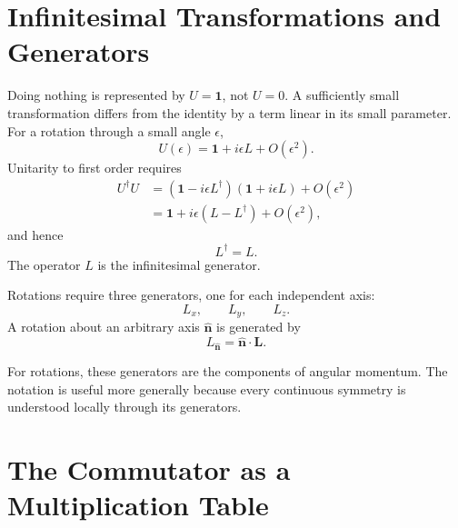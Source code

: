 \section{Infinitesimal Transformations and Generators}

Doing nothing is represented by \(U=\mathbf 1\), not \(U=0\). A sufficiently small transformation differs from the identity by a term linear in its small parameter. For a rotation through a small angle \(\epsilon\),
\begin{equation}
U(\epsilon)=\mathbf 1+i\epsilon L+O(\epsilon^2).
\end{equation}
Unitarity to first order requires
\begin{align}
U^\dagger U
&=\left(\mathbf 1-i\epsilon L^\dagger\right)
  \left(\mathbf 1+i\epsilon L\right)+O(\epsilon^2)\\
&=\mathbf 1+i\epsilon(L-L^\dagger)+O(\epsilon^2),
\end{align}
and hence
\begin{equation}
L^\dagger=L.
\end{equation}
The operator \(L\) is the infinitesimal generator.

Rotations require three generators, one for each independent axis:
\begin{equation}
L_x,\qquad L_y,\qquad L_z.
\end{equation}
A rotation about an arbitrary axis \(\widehat{\bm n}\) is generated by
\begin{equation}
L_{\widehat{\bm n}}=\widehat{\bm n}\cdot\bm L.
\end{equation}

\begin{classroomqa}
\end{classroomqa}

For rotations, these generators are the components of angular momentum. The notation is useful more generally because every continuous symmetry is understood locally through its generators.

\section{The Commutator as a Multiplication Table}

